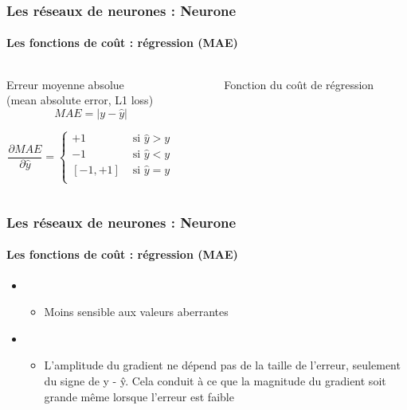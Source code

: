 \documentclass[xcolor=table]{beamer}
\begin{document}
\begin{frame}
\frametitle{Les réseaux de neurones : Neurone}
\framesubtitle{Les fonctions de coût : régression (MAE)}

\begin{columns}
	\begin{column}{.68\linewidth}
		\begin{block}{Erreur moyenne absolue \\(mean absolute error, L1 loss)}
			\[MAE = |y - \hat{y}|\]
			
			\[
			\frac{\partial MAE}{\partial \hat{y}} = 
			\begin{cases}
			+1 & \text{ si } \hat{y} > y \\
			-1 & \text{ si } \hat{y} < y \\
			[-1, +1] & \text{ si } \hat{y} = y \\
			\end{cases}
			\]
		\end{block}
	\end{column}%
	\begin{column}{.3\linewidth}
		\begin{figure}
			\caption{Fonction du coût de régression \cite{2017-rosenberg}}
		\end{figure}
	\end{column}
\end{columns}

\end{frame}

\begin{frame}
\frametitle{Les réseaux de neurones : Neurone}
\framesubtitle{Les fonctions de coût : régression (MAE)}

\begin{itemize}
	\item {}
	\begin{itemize}
		\item Moins sensible aux valeurs aberrantes
	\end{itemize}
	\item {}
	\begin{itemize}
		\item L'amplitude du gradient ne dépend pas de la taille de l'erreur, seulement du signe de y - ŷ. Cela conduit à ce que la magnitude du gradient soit grande même lorsque l'erreur est faible
	\end{itemize}
\end{itemize}

\end{frame}
\end{document}
